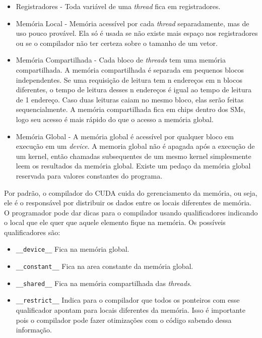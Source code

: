 \begin{itemize}
  \item Registradores - Toda variável de uma \textit{thread} fica em registradores.
  \item Memória Local - Memória acessível por cada \textit{thread} separadamente, mas de uso pouco provável. Ela só é usada se
          não existe mais espaço nos registradores ou se o compilador não ter certeza sobre o tamanho de um vetor.
  \item Memória Compartilhada - Cada bloco de \textit{threads} tem uma memória compartilhada. A memória compartilhada é separada em
          pequenos blocos independentes. Se uma requisição de leitura tem n endereços em n blocos diferentes, o tempo de leitura
          desses n endereços é igual ao tempo de leitura de 1 endereço. Caso duas leituras caiam no mesmo bloco, elas serão
          feitas sequencialmente. A memória compartilhada fica em chips dentro dos SMs, logo seu acesso é mais rápido do que o acesso a
          memória global.
  \item Memória Global - A memória global é acessível por qualquer bloco em execução em um \textit{device}. A memoria global não é
          apagada após a execução de um kernel, então chamadas subsequentes de um mesmo kernel simplesmente leem os resultados
          da memória global. Existe um pedaço da memória global reservada para valores constantes do programa.
\end{itemize}

Por padrão, o compilador do CUDA cuida do gerenciamento da memória, ou seja, ele é o responsável por distribuir os dados 
entre os locais diferentes de memória. O programador pode dar dicas para o compilador usando qualificadores indicando o local
que ele quer que aquele elemento fique na memória. Os possíveis qualificadores são:
\begin{itemize}
  \item \verb#__device__# Fica na memória global.
  \item \verb#__constant__#   Fica na area constante da memória global.
  \item \verb#__shared__# Fica na memória compartilhada das \textit{threads}.
  \item \verb#__restrict__# Indica para o compilador que todos os ponteiros com esse qualificador apontam para locais diferentes
                            da memória. Isso é importante pois o compilador pode fazer otimizações com o código sabendo dessa informação.   
\end{itemize}

